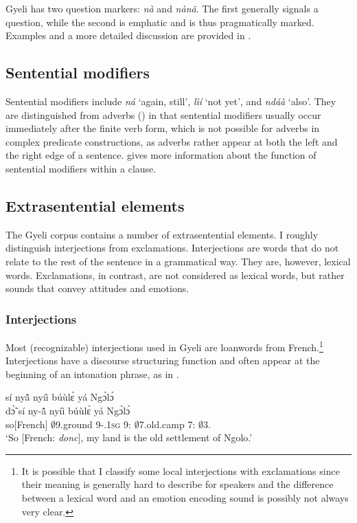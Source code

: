 Gyeli has two question markers: {\itshape nà} and {\itshape nànâ}. The first generally signals a question, while the second is emphatic and is thus pragmatically marked. Examples and a more detailed discussion are provided in .


\subsection{Sentential modifiers}
\label{sec:SentModPOS}

Sentential modifiers include {\itshape ná} `again, still', {\itshape lìí} `not yet', and {\itshape ndáà} `also'. They are distinguished from adverbs () in that sentential modifiers usually occur immediately after the finite verb form, which is not possible for adverbs in complex predicate constructions, as adverbs rather appear at both the left and the right edge of a sentence.  gives more information about the function of sentential modifiers within a clause.


\subsection{Extrasentential elements}
\label{sec:Extrasent}

The Gyeli corpus contains a number of extrasentential elements. I roughly distinguish interjections from exclamations. Interjections are words that do not relate to the rest of the sentence in a grammatical way. They are, however, lexical words. Exclamations, in contrast, are not considered as lexical words, but rather sounds that convey attitudes and emotions.

\subsubsection{Interjections}
\label{sec:Interjections}

Most (recognizable) interjections used in Gyeli are  loanwords from French.\footnote{It is possible that I classify some local interjections with exclamations since their meaning is generally hard to describe for speakers and the difference between a lexical word and an emotion encoding sound is possibly not always very clear.} Interjections have a discourse structuring function and often appear at the beginning of an intonation phrase, as in .

\ea \label{INTERJ1}
   sí nyã̂ nyíì búùlɛ̀ yá Ngɔ̀lɔ́ \\
        dɔ̃̀ sí ny-ã̂ nyíì búùlɛ̀ yá Ngɔ̀lɔ́ \\
        so[French] $\emptyset$9.ground 9-{\POSS}.1\textsc{sg} 9:{\COP} $\emptyset$7.old.camp 7:{\ATT} $\emptyset$3.{\PN}  \\
    \trans `So [French: {\itshape donc}], my land is the old settlement of Ngolo.'
\z

